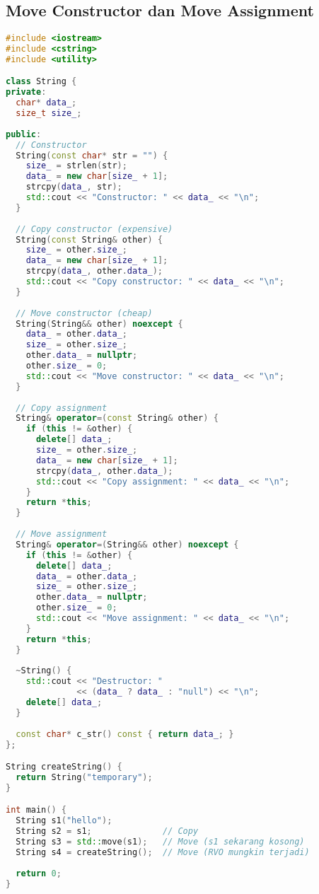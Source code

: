\documentclass[../main.tex]{subfiles}
\begin{document}
\subsection{Move Constructor dan Move Assignment}
\begin{lstlisting}[language=C++, caption={Implementasi move semantics}]
#include <iostream>
#include <cstring>
#include <utility>

class String {
private:
  char* data_;
  size_t size_;
  
public:
  // Constructor
  String(const char* str = "") {
    size_ = strlen(str);
    data_ = new char[size_ + 1];
    strcpy(data_, str);
    std::cout << "Constructor: " << data_ << "\n";
  }
  
  // Copy constructor (expensive)
  String(const String& other) {
    size_ = other.size_;
    data_ = new char[size_ + 1];
    strcpy(data_, other.data_);
    std::cout << "Copy constructor: " << data_ << "\n";
  }
  
  // Move constructor (cheap)
  String(String&& other) noexcept {
    data_ = other.data_;
    size_ = other.size_;
    other.data_ = nullptr;
    other.size_ = 0;
    std::cout << "Move constructor: " << data_ << "\n";
  }
  
  // Copy assignment
  String& operator=(const String& other) {
    if (this != &other) {
      delete[] data_;
      size_ = other.size_;
      data_ = new char[size_ + 1];
      strcpy(data_, other.data_);
      std::cout << "Copy assignment: " << data_ << "\n";
    }
    return *this;
  }
  
  // Move assignment
  String& operator=(String&& other) noexcept {
    if (this != &other) {
      delete[] data_;
      data_ = other.data_;
      size_ = other.size_;
      other.data_ = nullptr;
      other.size_ = 0;
      std::cout << "Move assignment: " << data_ << "\n";
    }
    return *this;
  }
  
  ~String() {
    std::cout << "Destructor: " 
              << (data_ ? data_ : "null") << "\n";
    delete[] data_;
  }
  
  const char* c_str() const { return data_; }
};

String createString() {
  return String("temporary");
}

int main() {
  String s1("hello");
  String s2 = s1;              // Copy
  String s3 = std::move(s1);   // Move (s1 sekarang kosong)
  String s4 = createString();  // Move (RVO mungkin terjadi)
  
  return 0;
}
\end{lstlisting}
\end{document}
